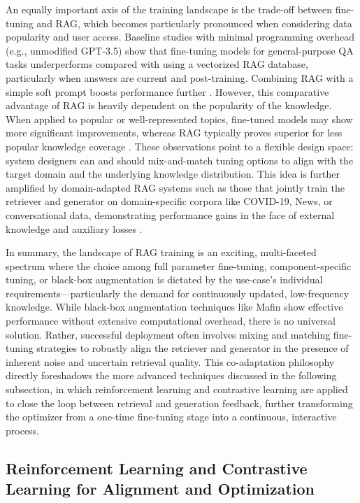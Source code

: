 \documentclass[11pt]{article}
\begin{document}
An equally important axis of the training landscape is the trade-off between fine-tuning and RAG, which becomes particularly pronounced when considering data popularity and user access. Baseline studies with minimal programming overhead (e.g., unmodified GPT-3.5) show that fine-tuning models for general-purpose QA tasks underperforms compared with using a vectorized RAG database, particularly when answers are current and post-training. Combining RAG with a simple soft prompt boosts performance further \cite{ref76}. However, this comparative advantage of RAG is heavily dependent on the popularity of the knowledge. When applied to popular or well-represented topics, fine-tuned models may show more significant improvements, whereas RAG typically proves superior for less popular knowledge coverage \cite{ref77}. These observations point to a flexible design space: system designers can and should mix-and-match tuning options to align with the target domain and the underlying knowledge distribution. This idea is further amplified by domain-adapted RAG systems such as those that jointly train the retriever and generator on domain-specific corpora like COVID-19, News, or conversational data, demonstrating performance gains in the face of external knowledge and auxiliary losses \cite{ref78}.

In summary, the landscape of RAG training is an exciting, multi-faceted spectrum where the choice among full parameter fine-tuning, component-specific tuning, or black-box augmentation is dictated by the use-case's individual requirements---particularly the demand for continuously updated, low-frequency knowledge. While black-box augmentation techniques like Mafin \cite{ref54} show effective performance without extensive computational overhead, there is no universal solution. Rather, successful deployment often involves mixing and matching fine-tuning strategies to robustly align the retriever and generator in the presence of inherent noise and uncertain retrieval quality. This co-adaptation philosophy directly foreshadows the more advanced techniques discussed in the following subsection, in which reinforcement learning and contrastive learning are applied to close the loop between retrieval and generation feedback, further transforming the optimizer from a one-time fine-tuning stage into a continuous, interactive process.

\subsection{Reinforcement Learning and Contrastive Learning for Alignment and Optimization}
\end{document}
